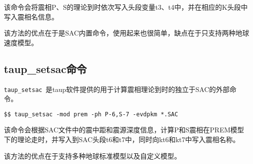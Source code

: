 该命令会将震相P、S的理论到时依次写入头段变量t3、t4中，并在相应的K头段中写入震相名信息。

该方法的优点在于是SAC内置命令，使用起来也很简单，缺点在于只支持两种地球速度模型。

\subsection{taup\_setsac命令}
\verb+taup_setsac+~是taup软件提供的用于计算震相理论到时的独立于SAC的外部命令。

\begin{verbatim}
$$ taup_setsac -mod prem -ph P-6,S-7 -evdpkm *.SAC
\end{verbatim}

该命令会根据SAC文件中的震中距和震源深度信息，计算P和S震相在PREM模型下的理论走时，并写入到SAC头段t6和t7中，同时向kt6和kt7中写入震相名称。

该方法的优点在于支持多种地球标准模型以及自定义模型。
